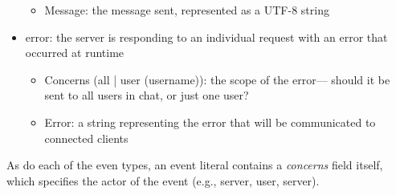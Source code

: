 \documentclass{article}
\begin{document}
\begin{itemize}
\begin{itemize}
			\item Message: the message sent, represented as a UTF-8 string
		\end{itemize}
	\item error: the server is responding to an individual request with an
		error that occurred at runtime
		\begin{itemize}
			\item Concerns (all | user (username)): the scope of the error---
				should it be sent to all users in chat, or just one user?
			\item Error: a string representing the error that will be
				communicated to connected clients
		\end{itemize}
\end{itemize}

As do each of the even types, an event literal contains a \emph{concerns} field
itself, which specifies the actor of the event (e.g., server, user, server).
\end{document}
